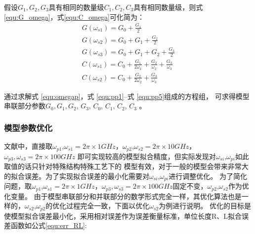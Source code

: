 假设$G_1,G_2,G_3$具有相同的数量级$C_1,C_2,C_3$具有相同数量级，则\mbox{式\ref{equ:G_omega}，式\ref{equ:C_omega}}可化简为：
\begin{gather}
  G(\omega_{s1})=G_0+\frac{G_1}{2}  \label{equ:pp1} \\
  G(\omega_{s2})=G_0+G_1+\frac{G_2}{2} \label{equ:pp2}  \\
  G(\omega_{s3})=G_0+G_1+G_2+\frac{G_3}{2} \label{equ:pp3} \\
  C(\omega_{s1})=C_0+\frac{G_1}{2\omega_1}+\frac{G_2}{\omega_2}+\frac{G_3}{\omega_3} \label{equ:pp4} \\
   C(\omega_{s2})=C_0+\frac{G_2}{2\omega_2}+\frac{G_3}{\omega_3} \label{equ:pp5}
\end{gather}

通过求解式 \ref{equ:omegap}，式 \ref{equ:pp1}--式 \ref{equ:pp5}组成的方程组，
可求得模型串联部分参数$G_0  ,G_1,G_2$, $G_3$, $C_0$, $C_1$, $C_2$, $C_3$  。

\subsubsection{模型参数优化}
文献\cite{brinkhoff2008scalable}中，直接取$\omega_{p1}$,$\omega_{s1}=2π×1GHz$，$\omega_{p2}$,$\omega_{s2}=2π×10GHz$，$\omega_{p3},\omega_{s3}=2π×100GHz$
即可实现较高的模型拟合精度，但实际发现对$\omega_{si}$,$\omega_{pi}$如此取值的话只针对特殊结构特殊工艺下的
模型有效，对于一般的模型会带来非常大的拟合误差。为了实现拟合误差的最小化需要对$\omega_{si}$,$\omega_{pi}$进行调整优化。
为了简化问题，取$\omega_{p1}$,$\omega_{s1}=2π×1GHz$，$\omega_{p3},\omega_{s3}=2π×100GHz$固定不变，$\omega_{p2}$,$\omega_{s2}$作为优化变量。
由于模型串联部分和并联部分的数学形式完全一样，其优化算法也是一样的，$\omega_{s2}$,$\omega_{p2}$的优化过程完全一致，下面以优化$\omega_{s2}$为例进行说明。
优化的目标是使模型拟合误差最小化，采用相对误差作为误差衡量标准，单位长度R、L拟合误差函数如公式\ref{equ:err_RL}:

